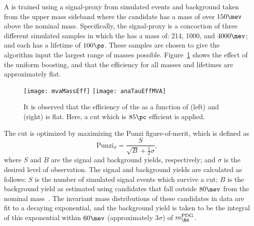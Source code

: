 A \uBDT is trained using a signal-proxy from simulated events and background taken from the upper
\Bd mass sideband where the \Bd candidate has a mass of over $150\mev$ above the nominal \Bd mass.
Specifically, the signal-proxy is a concoction of three different simulated samples in which the
\db has a mass of: 214, 1000, and $4000\mev$; and each has a lifetime of $100\ps$.
These samples are chosen to give the \uBDT algorithm input the largest range of masses possible.
Figure~\ref{fig:db:bdtflat} shows the effect of the uniform boosting, and that the efficiency for
all masses and lifetimes are approximately flat.

\begin{figure}
  \begin{center}
    \texttt{[image: mvaMassEff]}
    \texttt{[image: anaTauEffMVA]}
    \caption[Signal efficiency of the uBDT as a function of mass and lifetime]
    {
      It is observed that the efficiency of the \uBDT as a function of
      (left) \mdb and
      (right) \tdb is flat.
      Here, a cut which is \approx$85\pc$ efficient is applied.
    }
    \label{fig:db:bdtflat}
  \end{center}
\end{figure}


%

The \uBDT cut is optimized  by maximizing
the Punzi figure-of-merit, which is defined as
\begin{equation}
  \mathrm{Punzi}_\sigma = \frac{S}{\sqrt{B} + \tfrac12\sigma},
  \label{eq:db:punzi}
\end{equation}
where $S$ and $B$ are the signal and background yields, respectively; and $\sigma$ is the desired
level of observation.
The signal and background yields are calculated as follows:
$S$ is the number of simulated signal events which survive a \uBDT cut;
$B$ is the background yield as estimated using \btokstrdb candidates
that fall outside $80\mev$ from the nominal \Bd mass~\cite{PDG2014}.
The invariant mass distributions of these candidates in data are fit to a decaying exponential,
and the background yield is taken to be the integral of this exponential within $60\mev$
(approximately $3\sigma$) of $m^\mathrm{PDG}_{\Bd}$.

